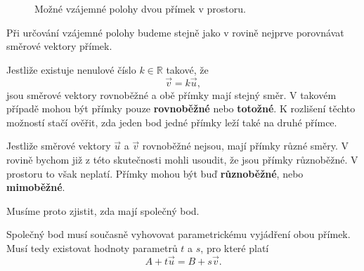 \begin{figure}[H]
\begin{minipage}{0.48\textwidth}
    \end{minipage}

    \caption{Možné vzájemné polohy dvou přímek v prostoru.}
    \label{fig:Relative_positions_lines_space}
\end{figure}

Při určování vzájemné polohy budeme stejně jako v rovině nejprve
porovnávat směrové vektory přímek.

Jestliže existuje nenulové číslo $k\in\mathbb{R}$ takové, že
\[
    \vec{v}=k\vec{u},
\]
jsou směrové vektory rovnoběžné a obě přímky mají stejný směr.
V takovém případě mohou být přímky pouze \textbf{rovnoběžné}
nebo \textbf{totožné}. K rozlišení těchto možností stačí ověřit,
zda jeden bod jedné přímky leží také na druhé přímce.

Jestliže směrové vektory $\vec{u}$ a $\vec{v}$ rovnoběžné nejsou,
mají přímky různé směry. V rovině bychom již z této skutečnosti mohli
usoudit, že jsou přímky různoběžné. V prostoru to však neplatí.
Přímky mohou být buď \textbf{různoběžné}, nebo
\textbf{mimoběžné}.

Musíme proto zjistit, zda mají společný bod.

Společný bod musí současně vyhovovat parametrickému vyjádření obou
přímek. Musí tedy existovat hodnoty parametrů $t$ a $s$, pro které
platí
\[
    A+t\vec{u}=B+s\vec{v}.
\]

